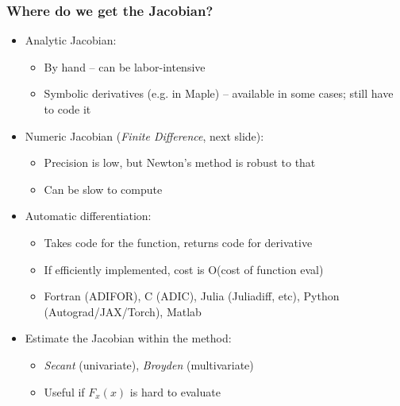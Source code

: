 \documentclass[bigger]{beamer}
\begin{document}
\begin{frame}

\frametitle{Where do we get the Jacobian?}

\begin{itemize}
\item Analytic Jacobian:

\begin{itemize}
\item By hand -- can be labor-intensive

\item Symbolic derivatives (e.g. in Maple) -- available in some cases; still have to code it
\end{itemize}

\item Numeric Jacobian (\emph{Finite Difference}, next slide):

\begin{itemize}
\item Precision is low, but Newton's method is robust to that

\item Can be slow to compute
\end{itemize}

\item Automatic differentiation:

\begin{itemize}
\item Takes code for the function, returns code for derivative
\item If efficiently implemented, cost is O(cost of function eval)
\item Fortran (ADIFOR), C (ADIC), Julia (Juliadiff, etc), Python (Autograd/JAX/Torch), Matlab
\end{itemize}

\item Estimate the Jacobian within the method:

\begin{itemize}
\item \emph{Secant} (univariate), \emph{Broyden} (multivariate)

\item Useful if $F_{x}\left( x\right) $ is hard to evaluate
\end{itemize}
\end{itemize}


\end{frame}%
\end{document}
